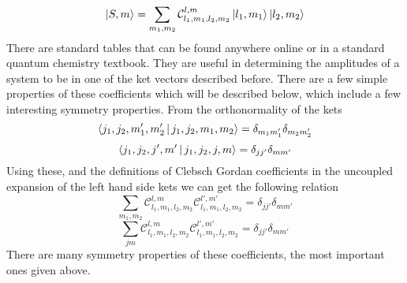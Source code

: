 \documentclass[12pt]{article}
\begin{document}
$$\Ket{S,m} = \sum_{m_1,m_2}\mathcal{C}_{l_1,m_1,l_2,m_2}^{l,m}\Ket{l_1,m_1}\Ket{l_2,m_2}$$ There are standard tables that can be found anywhere online or in a standard quantum chemistry textbook. They are useful in determining the amplitudes of a system to be in one of the ket vectors described before. There are a few simple properties of these coefficients which will be described below, which include a few interesting symmetry properties. From the orthonormality of the kets $$\Braket{j_1,j_2,m'_1,m'_2|j_1,j_2,m_1,m_2} = \delta_{m_1m'_1}\delta_{m_2m'_2}$$
$$\Braket{j_1,j_2,j',m'|j_1,j_2,j,m} = \delta_{jj'}\delta_{mm'}$$ Using these, and the definitions of Clebsch Gordan coefficients in the uncoupled expansion of the left hand side kets we can get the following relation 
$$\sum_{m_1,m_2}\mathcal{C}_{l_1,m_1,l_2,m_2}^{l,m}\mathcal{C}_{l_1,m_1,l_2,m_2}^{l',m'} = \delta_{jj'}\delta_{mm'}$$
$$\sum_{jm}\mathcal{C}_{l_1,m_1,l_2,m_2}^{l,m}\mathcal{C}_{l_1,m_1,l_2,m_2}^{l',m'} = \delta_{jj'}\delta_{mm'}$$
There are many symmetry properties of these coefficients, the most important ones given above. 


\end{document}
